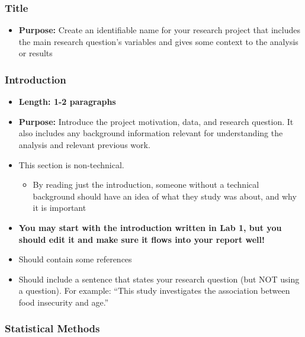 \documentclass[
  letterpaper,
  DIV=11,
  numbers=noendperiod]{scrartcl}
\providecommand{\tightlist}{%
  \setlength{\itemsep}{0pt}\setlength{\parskip}{0pt}}\usepackage{longtable,booktabs,array}
\begin{document}
\hypertarget{title}{%
\subsubsection{Title}\label{title}}

\begin{itemize}
\tightlist
\item
  \textbf{Purpose:} Create an identifiable name for your research
  project that includes the main research question's variables and gives
  some context to the analysis or results
\end{itemize}

\hypertarget{introduction}{%
\subsubsection{Introduction}\label{introduction}}

\begin{itemize}
\tightlist
\item
  \textbf{Length: 1-2 paragraphs}
\item
  \textbf{Purpose:} Introduce the project motivation, data, and research
  question. It also includes any background information relevant for
  understanding the analysis and relevant previous work.
\item
  This section is non-technical.

  \begin{itemize}
  \tightlist
  \item
    By reading just the introduction, someone without a technical
    background should have an idea of what they study was about, and why
    it is important
  \end{itemize}
\item
  {\textbf{You may start with the introduction written in Lab 1, but you
  should edit it and make sure it flows into your report well!}}
\item
  Should contain some references
\item
  Should include a sentence that states your research question (but NOT
  using a question). For example: ``This study investigates the
  association between food insecurity and age.''
\end{itemize}

\hypertarget{statistical-methods}{%
\subsubsection{Statistical Methods}\label{statistical-methods}}
\end{document}
